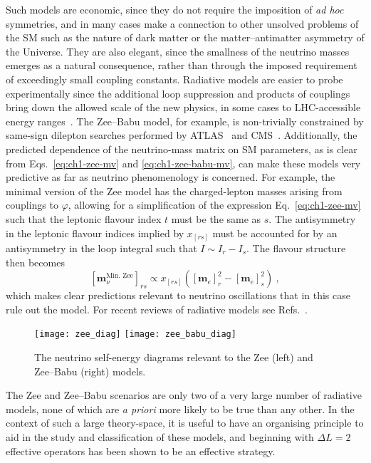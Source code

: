 Such models are economic, since they do not require the imposition of \textit{ad
  hoc} symmetries, and in many cases make a connection to other unsolved
problems of the SM such as the nature of dark matter or the matter--antimatter
asymmetry of the Universe. They are also elegant, since the smallness of the
neutrino masses emerges as a natural consequence, rather than through the
imposed requirement of exceedingly small coupling constants. Radiative models
are easier to probe experimentally since the additional loop suppression and
products of couplings bring down the allowed scale of the new physics, in some
cases to LHC-accessible energy ranges~\cite{deGouvea:2007qla}. The Zee--Babu
model, for example, is non-trivially constrained by same-sign dilepton searches
performed by ATLAS~\cite{ATLAS:2012hi, ATLAS:2014kca, Aaboud:2017qph} and
CMS~\cite{Chatrchyan:2012ya, CMS:2016cpz, CMS:2017pet}. Additionally, the
predicted dependence of the neutrino-mass matrix on SM parameters, as is clear
from Eqs.~\eqref{eq:ch1-zee-mv} and \eqref{eq:ch1-zee-babu-mv}, can make these
models very predictive as far as neutrino phenomenology is concerned. For
example, the minimal version of the Zee model has the charged-lepton masses
arising from couplings to $\varphi$, allowing for a simplification of the
expression Eq.~\eqref{eq:ch1-zee-mv} such that the leptonic flavour index $t$
must be the same as $s$. The antisymmetry in the leptonic flavour indices
implied by $x_{[rs]}$ must be accounted for by an antisymmetry in the loop
integral such that $I \sim I_{r} - I_{s}$. The flavour structure then
becomes~\cite{Wolfenstein:1980sy}
\begin{equation}
  \label{eq:ch1-zee-wolfenstein-mv}
  [\mathbf{m}_{\nu}^{\text{Min. Zee}}]_{rs} \propto x_{[rs]} ([\mathbf{m}_{e}]_{r}^{2} - [\mathbf{m}_{e}]_{s}^{2}) \ ,
\end{equation}
which makes clear predictions relevant to neutrino oscillations that in this
case rule out the model. For recent reviews of radiative models see
Refs.~\cite{Boucenna:2014zba, Cai:2017jrq}.

\begin{figure}[t]
  \centering
  \texttt{[image: zee\_diag]}
  \texttt{[image: zee\_babu\_diag]}
  \caption{The neutrino self-energy diagrams relevant to the Zee (left) and
    Zee--Babu (right) models.}
  \label{fig:ch1-zee-and-zee-babu-diags}
\end{figure}

The Zee and Zee--Babu scenarios are only two of a very large number of radiative
models, none of which are \textit{a priori} more likely to be true than any
other. In the context of such a large theory-space, it is useful to have an
organising principle to aid in the study and classification of these models, and
beginning with $\Delta L = 2$ effective operators has been shown to be an
effective strategy.

